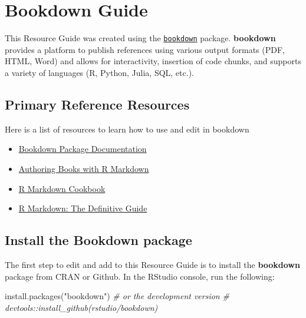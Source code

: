 \documentclass[
]{book}
\newenvironment{Shaded}{\begin{snugshade}}{\end{snugshade}}
\newcommand{\CommentTok}[1]{\textcolor[rgb]{0.56,0.35,0.01}{\textit{#1}}}
\newcommand{\FunctionTok}[1]{\textcolor[rgb]{0.00,0.00,0.00}{#1}}
\newcommand{\NormalTok}[1]{#1}
\newcommand{\StringTok}[1]{\textcolor[rgb]{0.31,0.60,0.02}{#1}}
\providecommand{\tightlist}{%
  \setlength{\itemsep}{0pt}\setlength{\parskip}{0pt}}
\begin{document}
\hypertarget{bookdown}{%
\chapter{Bookdown Guide}\label{bookdown}}

This Resource Guide was created using the \href{https://github.com/rstudio/bookdown}{\texttt{bookdown}} package. \textbf{bookdown} provides a platform to publish references using various output formats (PDF, HTML, Word) and allows for interactivity, insertion of code chunks, and supports a variety of languages (R, Python, Julia, SQL, etc.).

\hypertarget{primary-reference-resources}{%
\section{Primary Reference Resources}\label{primary-reference-resources}}

Here is a list of resources to learn how to use and edit in bookdown

\begin{itemize}
\tightlist
\item
  \href{https://bookdown.org/}{Bookdown Package Documentation}
\item
  \href{https://bookdown.org/yihui/bookdown/}{Authoring Books with R Markdown}
\item
  \href{https://bookdown.org/yihui/rmarkdown-cookbook/}{R Markdown Cookbook}
\item
  \href{https://bookdown.org/yihui/rmarkdown/}{R Markdown: The Definitive Guide}
\end{itemize}

\hypertarget{install-the-bookdown-package}{%
\section{Install the Bookdown package}\label{install-the-bookdown-package}}

The first step to edit and add to this Resource Guide is to install the \textbf{bookdown} package from CRAN or Github. In the RStudio console, run the following:

\begin{Shaded}
\begin{Highlighting}[]
\FunctionTok{install.packages}\NormalTok{(}\StringTok{"bookdown"}\NormalTok{)}
\CommentTok{\# or the development version}
\CommentTok{\# devtools::install\_github(\textquotesingle{}rstudio/bookdown\textquotesingle{})}
\end{Highlighting}
\end{Shaded}
\end{document}
